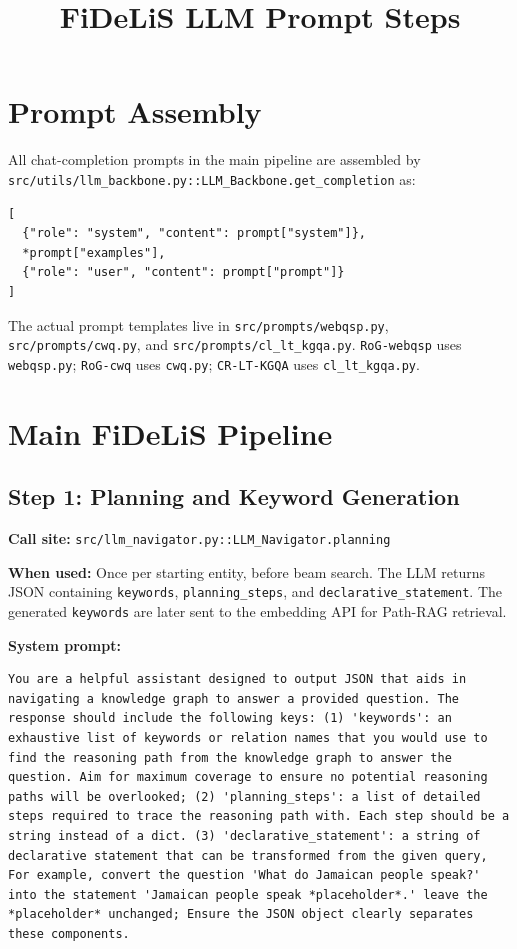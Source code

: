 \documentclass[11pt]{article}
\title{FiDeLiS LLM Prompt Steps}
\author{}
\date{}
\begin{document}
\maketitle

\section{Prompt Assembly}

All chat-completion prompts in the main pipeline are assembled by
\texttt{src/utils/llm\_backbone.py::LLM\_Backbone.get\_completion} as:

\begin{lstlisting}[style=prompt]
[
  {"role": "system", "content": prompt["system"]},
  *prompt["examples"],
  {"role": "user", "content": prompt["prompt"]}
]
\end{lstlisting}

The actual prompt templates live in \texttt{src/prompts/webqsp.py},
\texttt{src/prompts/cwq.py}, and \texttt{src/prompts/cl\_lt\_kgqa.py}.
\texttt{RoG-webqsp} uses \texttt{webqsp.py}; \texttt{RoG-cwq} uses
\texttt{cwq.py}; \texttt{CR-LT-KGQA} uses \texttt{cl\_lt\_kgqa.py}.

\section{Main FiDeLiS Pipeline}

\subsection{Step 1: Planning and Keyword Generation}

\textbf{Call site:} \texttt{src/llm\_navigator.py::LLM\_Navigator.planning}

\textbf{When used:} Once per starting entity, before beam search. The LLM returns
JSON containing \texttt{keywords}, \texttt{planning\_steps}, and
\texttt{declarative\_statement}. The generated \texttt{keywords} are later sent
to the embedding API for Path-RAG retrieval.

\textbf{System prompt:}
\begin{lstlisting}[style=prompt]
You are a helpful assistant designed to output JSON that aids in navigating a knowledge graph to answer a provided question. The response should include the following keys: (1) 'keywords': an exhaustive list of keywords or relation names that you would use to find the reasoning path from the knowledge graph to answer the question. Aim for maximum coverage to ensure no potential reasoning paths will be overlooked; (2) 'planning_steps': a list of detailed steps required to trace the reasoning path with. Each step should be a string instead of a dict. (3) 'declarative_statement': a string of declarative statement that can be transformed from the given query, For example, convert the question 'What do Jamaican people speak?' into the statement 'Jamaican people speak *placeholder*.' leave the *placeholder* unchanged; Ensure the JSON object clearly separates these components.
\end{lstlisting}
\end{document}
